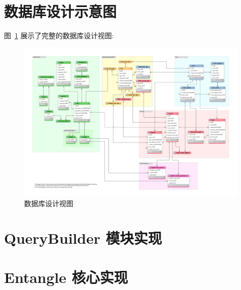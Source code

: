 
\newpage

\section{数据库设计示意图}
\label{sec:appendix-database-diagram}

图~\ref{FullDatabaseDesign} 展示了完整的数据库设计视图:

\begin{figure}[!h]
  \begin{center}
    \includegraphics[angle=90, scale=0.5]{figures/eer-120dpi.png}
    \caption{数据库设计视图\label{FullDatabaseDesign}}
  \end{center}
\end{figure}

\newpage

\section{QueryBuilder 模块实现}



\newpage

\section{Entangle 核心实现}





